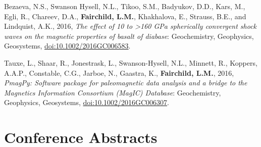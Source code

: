 \documentclass[11pt,a4paper,sans]{moderncv}
\begin{document}
\begin{etaremune}[itemsep=3pt]
    \item{Bezaeva, N.S., Swanson Hysell, N.L., Tikoo, S.M., Badyukov, D.D.,
            Kars, M., Egli, R., Chareev, D.A., \textbf{Fairchild, L.M.},
            Khakhalova, E., Strauss, B.E., and Lindquist, A.K., 2016,
            \textit{The effect of 10 to >160 GPa spherically convergent shock
            waves on the magnetic properties of basalt of diabase}:
            Geochemistry, Geophysics, Geosystems,
            {\color{cyan}\href{https://doi.org/10.1002/2016GC006583}
        {doi:10.1002/2016GC006583}}.}

    \item{Tauxe, L., Shaar, R., Jonestrask, L., Swanson-Hysell, N.L., Minnett,
            R., Koppers, A.A.P., Constable, C.G., Jarboe, N., Gaastra,  K.,
            \textbf{Fairchild, L.M.}, 2016, \textit{PmagPy: Software package for
                paleomagnetic data analysis and a bridge to the Magnetics
            Information Consortium (MagIC) Database}: Geochemistry,
            Geophysics, Geosystems,
            {\color{cyan}\href{https://doi.org/10.1002/2016GC006307}
        {doi:10.1002/2016GC006307}}.}

\end{etaremune}

\section{Conference Abstracts}
\vspace{6pt}
\end{document}
